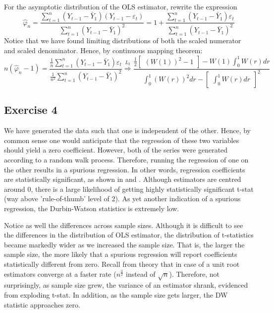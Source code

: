\documentclass[]{article}
\begin{document}
\begin{enumerate}[label = \alph*)]
\begin{equation}
\begin{split}
	\end{split}
	\end{equation}
	For the asymptotic distribution of the OLS estimator, rewrite the expression
	\begin{equation}
		\hat{\varphi}_n = \frac{\sum\limits_{t = 1}^n(Y_{t-1} - \bar{Y}_1)(Y_{t-1} - \varepsilon_t)}{\sum\limits_{t = 1}^n(Y_{t-1} - \bar{Y}_1)^2} = 1 + \frac{\sum\limits_{t = 1}^n(Y_{t-1} - \bar{Y}_1)\varepsilon_t}{\sum\limits_{t = 1}^n(Y_{t-1} - \bar{Y}_1)^2} \nonumber
	\end{equation}
	Notice that we have found limiting distributions of both the scaled numerator and scaled denominator. Hence, by continuous mapping theorem:
	\begin{equation}
		n(\hat{\varphi}_n - 1) = \frac{\frac{1}{n}\sum\limits_{t = 1}^n(Y_{t-1} - \bar{Y}_1)\varepsilon_t}{\frac{1}{n^2}\sum\limits_{t = 1}^n(Y_{t-1} - \bar{Y}_1)^2} \overset{L_2}{\Longrightarrow} \frac{\frac{1}{2}\begin{bmatrix}(W(1))^2 - 1\end{bmatrix} - W(1)\int_{0}^{1}W(r)dr}{\int_{0}^{1}(W(r))^2dr - \begin{bmatrix}\int_{0}^{1}W(r)dr\end{bmatrix}^2} \nonumber
	\end{equation}
\end{enumerate}

\subsection*{Exercise 4}

We have generated the data such that one is independent of the other. Hence, by common sense one would anticipate that the regression of these two variables should yield a zero coefficient. However, both of the series were generated according to a random walk process. Therefore, running the regression of one on the other results in a spurious regression. In other words, regression coefficients are statistically significant, as shown in  and . Although estimators are centred around 0, there is a large likelihood of getting highly statistically significant t-stat (way above 'rule-of-thumb' level of 2). As yet another indication of a spurious regression, the Durbin-Watson statistics is extremely low.

Notice as well the differences across sample sizes. Although it is difficult to see the differences in the distribution of OLS estimator, the distribution of t-statistics became markedly wider as we increased the sample size. That is, the larger the sample size, the more likely that a spurious regression will report coefficients statistically different from zero. Recall from theory that in case of a unit root estimators converge at a faster rate ($n^{\frac{3}{2}}$ instead of $\sqrt{n}$). Therefore, not surprisingly, as sample size grew, the variance of an estimator shrank, evidenced from exploding t-stat. In addition, as the sample size gets larger, the DW statistic approaches zero.
\end{document}
